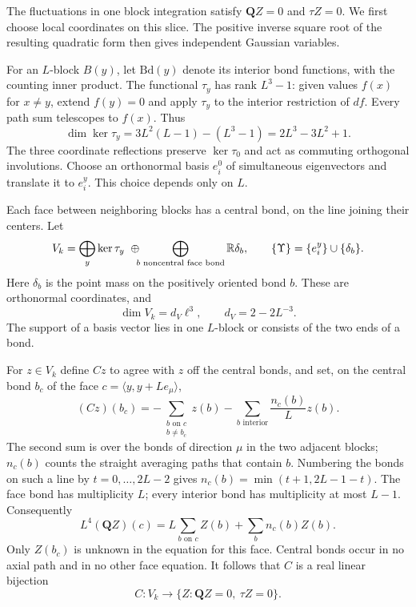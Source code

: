 The fluctuations in one block integration satisfy
$\mathbf Q Z=0$ and $\tau Z=0$. We first choose local coordinates
on this slice. The positive inverse square root of the resulting
quadratic form then gives independent Gaussian variables.

For an $L$-block $B(y)$, let $\mathrm{Bd}(y)$ denote its interior
bond functions, with the counting inner product. The functional
$\tau_y$ has rank $L^3-1$: given values $f(x)$ for $x\ne y$, extend
$f(y)=0$ and apply $\tau_y$ to the interior restriction of $df$.
Every path sum telescopes to $f(x)$. Thus
\[
 \dim\ker\tau_y=3L^2(L-1)-(L^3-1)=2L^3-3L^2+1.
\]
The three coordinate reflections preserve $\ker\tau_0$ and act as
commuting orthogonal involutions. Choose an orthonormal basis
$e_i^0$ of simultaneous eigenvectors and translate it to $e_i^y$.
This choice depends only on $L$.

Each face between neighboring blocks has a central bond, on the
line joining their centers. Let
\[
 V_k=\bigoplus_y\ker\tau_y\ \oplus\!\!\!
       \bigoplus_{b\text{ noncentral face bond}}\mathbb R\delta_b,
 \qquad
 \{\Upsilon\}=\{e_i^y\}\cup\{\delta_b\}.
\]
Here $\delta_b$ is the point mass on the positively oriented bond
$b$. These are orthonormal coordinates, and
\begin{equation}\label{eq:photon-fluctuation-dimension}
 \dim V_k=d_V\ell^3,\qquad d_V=2-2L^{-3}.
\end{equation}
The support of a basis vector lies in one $L$-block or consists of
the two ends of a bond.

For $z\in V_k$ define $Cz$ to agree with $z$ off the central bonds,
and set, on the central bond $b_c$ of the face
$c=\langle y,y+Le_\mu\rangle$,
\begin{equation}\label{eq:photon-central-bond-elimination}
 (Cz)(b_c)=-\sum_{\substack{b\text{ on }c\\b\ne b_c}}z(b)
                -\sum_{b\text{ interior}}\frac{n_c(b)}Lz(b).
\end{equation}
The second sum is over the bonds of direction $\mu$ in the two
adjacent blocks; $n_c(b)$ counts the straight averaging paths that
contain $b$. Numbering the bonds on such a line by
$t=0,\ldots,2L-2$ gives
$n_c(b)=\min(t+1,2L-1-t)$. The face bond has multiplicity $L$;
every interior bond has multiplicity at most $L-1$. Consequently
\[
 L^4(\mathbf QZ)(c)=L\sum_{b\text{ on }c}Z(b)
                            +\sum_b n_c(b)Z(b).
\]
Only $Z(b_c)$ is unknown in the equation for this face. Central
bonds occur in no axial path and in no other face equation.
It follows that $C$ is a real linear bijection
\begin{equation}\label{eq:photon-coordinate-bijection}
 C:V_k\longrightarrow
       \{Z:\mathbf QZ=0,\ \tau Z=0\}.
\end{equation}

